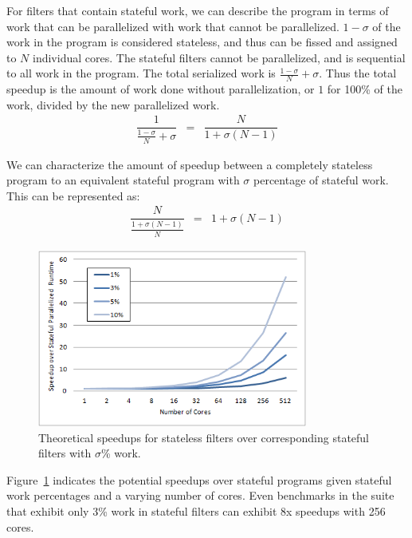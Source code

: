 For filters that contain stateful work, we can describe the program in terms of work that can be parallelized with work that cannot be parallelized.  $1-\sigma$ of the work in the program is considered stateless, and thus can be fissed and assigned to $N$ individual cores.  The stateful filters cannot be parallelized, and is sequential to all work in the program.  The total serialized work is $\frac{1-\sigma}{N} + \sigma$.  Thus the total speedup is the amount of work done without parallelization, or $1$ for 100\% of the work, divided by the new parallelized work.  
\begin{eqnarray*}
\dfrac{1}{\frac{1-\sigma}{N} + \sigma} &=& \dfrac{N}{1 + \sigma(N-1)}
\end{eqnarray*}

We can characterize the amount of speedup between a completely stateless program to an equivalent stateful program with $\sigma$ percentage of stateful work.  This can be represented as:
\begin{eqnarray*}
\dfrac{N}{\frac{1 + \sigma(N-1)}{N}} &=& 1 + \sigma(N-1)
\end{eqnarray*}



\begin{figure}[t]
\includegraphics[width=3.5in]{figures/theoretical-speedups.png}
\caption{Theoretical speedups for stateless filters over corresponding stateful filters with $\sigma$\% work.  \protect\label{fig:theo-speedups}}
\end{figure}

Figure~\ref{fig:theo-speedups} indicates the potential speedups over stateful programs given stateful work percentages and a varying number of cores.  Even benchmarks in the suite that exhibit only 3\% work in stateful filters can exhibit 8x speedups with 256 cores.  




